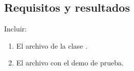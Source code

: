 \subsection{Requisitos y resultados}

Incluir:

\begin{enumerate}
 \item El archivo de la clase .
 \item El archivo con el demo de prueba.
\end{enumerate}

